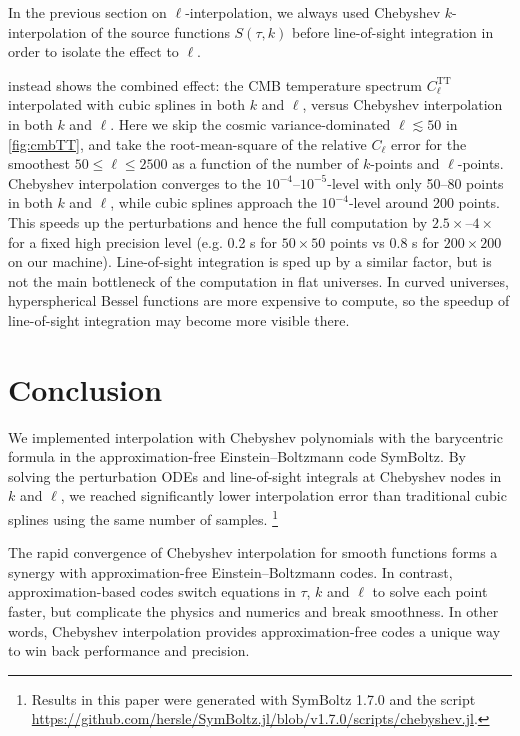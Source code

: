 \documentclass{aa}
\newcommand\EB{Einstein–Boltzmann}
\begin{document}
In the previous section on $\ell$-interpolation,
we always used Chebyshev $k$-interpolation of the source functions $S(\tau, k)$ before line-of-sight integration in order to isolate the effect to $\ell$.

 instead shows the combined effect:
the CMB temperature spectrum $C_\ell^\mathrm{TT}$ interpolated with cubic splines in both $k$ and $\ell$,
versus Chebyshev interpolation in both $k$ and $\ell$.
Here we skip the cosmic variance-dominated $\ell \lesssim 50$ in \cref{fig:cmbTT},
and take the root-mean-square of the relative $C_\ell$ error for the smoothest $50 \leq \ell \leq 2500$ as a function of the number of $k$-points and $\ell$-points.
Chebyshev interpolation converges to the $10^{-4}$--$10^{-5}$-level with only 50--80 points in both $k$ and $\ell$,
while cubic splines approach the $10^{-4}$-level around 200 points.
This speeds up the perturbations and hence the full computation by $2.5\times$--$4\times$ for a fixed high precision level
(e.g. 0.2 s for $50 \times 50$ points vs 0.8 s for $200 \times 200$ on our machine).
Line-of-sight integration is sped up by a similar factor,
but is not the main bottleneck of the computation in flat universes.
In curved universes, hyperspherical Bessel functions are more expensive to compute,
so the speedup of line-of-sight integration may become more visible there.

\section{Conclusion}
\label{sec:conclusion}

We implemented interpolation with Chebyshev polynomials with the barycentric formula in the approximation-free \EB{} code SymBoltz.
By solving the perturbation ODEs and line-of-sight integrals at Chebyshev nodes in $k$ and $\ell$,
we reached significantly lower interpolation error than traditional cubic splines using the same number of samples.%
\footnote{Results in this paper were generated with SymBoltz 1.7.0 and the script \url{https://github.com/hersle/SymBoltz.jl/blob/v1.7.0/scripts/chebyshev.jl}.}

The rapid convergence of Chebyshev interpolation for smooth functions forms a synergy with approximation-free \EB{} codes.
In contrast, approximation-based codes switch equations in $\tau$, $k$ and $\ell$ to solve each point faster,
but complicate the physics and numerics and break smoothness.
In other words, Chebyshev interpolation provides approximation-free codes a unique way to win back performance and precision.
\end{document}
